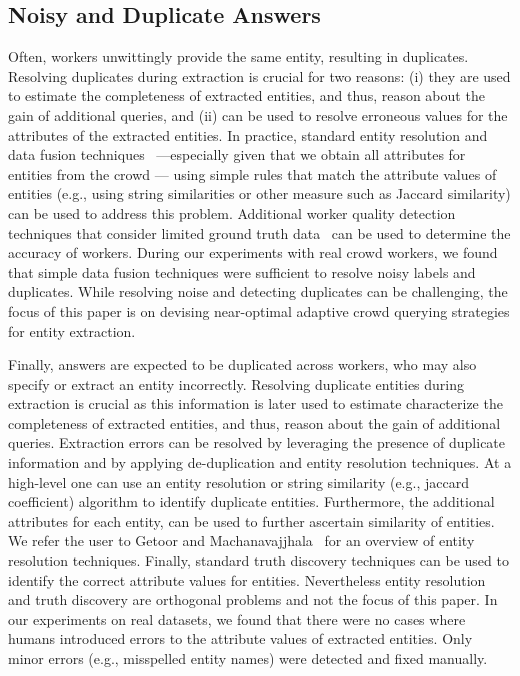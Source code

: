 \subsection{Noisy and Duplicate Answers} 
Often, workers unwittingly provide the same entity, resulting in duplicates. Resolving duplicates during extraction is crucial for two reasons: (i) they are used to estimate the completeness of extracted entities, and thus, reason about the gain of additional queries, and (ii) can be used to resolve erroneous values for the attributes of the extracted entities. In practice, standard entity resolution and data fusion techniques~\cite{getoor:kdd13} ---especially given that we obtain all attributes for entities from the crowd ---  using simple rules that match the attribute values of entities (e.g., using string similarities or other measure such as Jaccard similarity) can be used to address this problem. Additional worker quality detection techniques that consider limited ground truth data~\cite{donmez-learning-inference} can be used to determine the accuracy of workers. During our experiments with real crowd workers, we found that simple data fusion techniques were sufficient to resolve noisy labels and duplicates. While resolving noise and detecting duplicates can be challenging, the focus of this paper is on devising near-optimal adaptive crowd querying strategies for entity extraction. 

\iftr
Finally, answers are expected to be duplicated across workers, who may also specify or extract an entity incorrectly. Resolving duplicate entities during extraction is crucial as this information is later used to estimate characterize the completeness of extracted entities, and thus, reason about the gain of additional queries.  Extraction errors can be resolved by leveraging the presence of duplicate information and by applying de-duplication and entity resolution techniques. At a high-level one can use an entity resolution or string similarity (e.g., jaccard coefficient) algorithm to identify duplicate entities. Furthermore, the additional attributes for each entity, can be used to further ascertain similarity of entities. We refer the user to Getoor and Machanavajjhala~\cite{getoor:kdd13} for an overview of entity resolution techniques. Finally, standard truth discovery techniques can be used to identify the correct attribute values for entities. Nevertheless entity resolution and truth discovery are orthogonal problems and not the focus of this paper. In our experiments on real datasets, we found that there were no cases where humans introduced errors to the attribute values of extracted entities. Only minor errors (e.g., misspelled entity names) were detected and fixed manually. \fi

